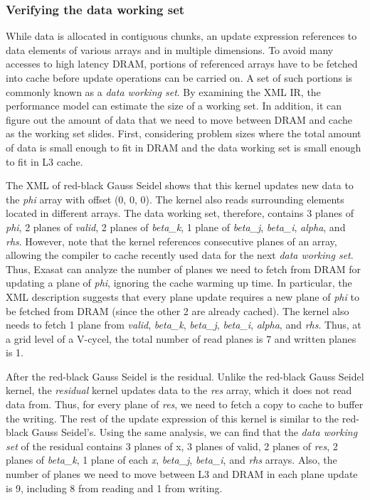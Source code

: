 \documentclass{article}
\begin{document}
\subsubsection{Verifying the data working set}
While data is allocated in contiguous chunks, an update expression references to data elements of various arrays and in multiple dimensions. 
To avoid many accesses to high latency DRAM, portions of referenced arrays have to be fetched into cache before update operations can be carried on.
A set of such portions is commonly known as a {\em data working set}.
By examining the XML IR, the performance model can estimate the size of a working set. 
In addition, it can figure out the amount of data that we need to move between DRAM and cache as the working set slides.
First, considering problem sizes where the total amount of data is small enough to fit in DRAM and the data working set is small enough to fit in L3 cache.

The XML of red-black Gauss Seidel shows that this kernel updates new data to the {\em phi} array with offset (0, 0, 0).
The kernel also reads surrounding elements located in different arrays.
The data working set, therefore, contains 3 planes of {\em phi}, 2 planes of {\em valid}, 2 planes of {\em beta\_k}, 1 plane of {\em beta\_j}, {\em beta\_i}, {\em alpha}, and {\em rhs}. 
However, note that the kernel references consecutive planes of an array, allowing the compiler to cache recently used data for the next {\em data working set}.
Thus, Exasat can analyze the number of planes we need to fetch from DRAM for updating a plane of {\em phi}, ignoring the cache warming up time.
In particular, the XML description suggests that every plane update requires a new plane of {\em phi} to be fetched from DRAM (since the other 2 are already cached). 
The kernel also needs to fetch 1 plane from {\em valid}, {\em beta\_k}, {\em beta\_j}, {\em beta\_i}, {\em alpha}, and {\em rhs}.
Thus, at a grid level of a V-cycel, the total number of read planes is 7 and written planes is 1.

After the red-black Gauss Seidel is the residual.
Unlike the red-black Gauss Seidel kernel, the {\em residual} kernel updates data to the {\em res} array, which it does not read data from.
Thus, for every plane of {\em res}, we need to fetch a copy to cache to buffer the writing.  
The rest of the update expression of this kernel is similar to the red-black Gauss Seidel's.
Using the same analysis, we can find that the {\em data working set} of the residual contains 3 planes of x, 3 planes of valid, 2 planes of {\em res}, 2 planes of {\em beta\_k}, 1 plane of each {\em x}, {\em beta\_j}, {\em beta\_i}, and {\em rhs} arrays.
Also, the number of planes we need to move between L3 and DRAM in each plane update is 9, including 8 from reading and 1 from writing.
\end{document}
